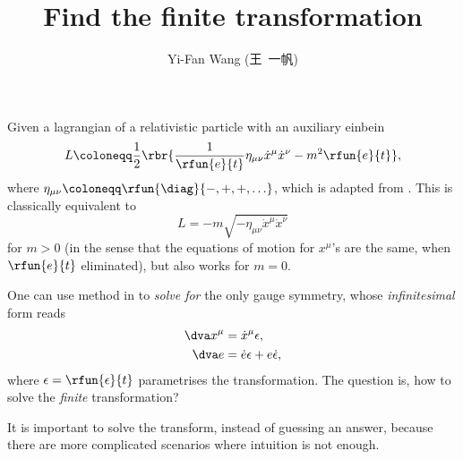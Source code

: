 \documentclass[a4paper,11pt]{article}
\title{Find the finite transformation}
\author{Yi-Fan Wang (王\ 一帆)}
\begin{document}
\maketitle

Given a lagrangian of a relativistic particle with an auxiliary einbein
\begin{equation}
L \coloneqq \frac{1}{2} \rbr{\frac{1}{\rfun{e}{t}}
\eta_{\mu\nu}\dot{x}^\mu \dot{x}^\nu - m^2 \rfun{e}{t}},
\label{eq:point-aux-lagrangian}
\end{equation}
where $\eta_{\mu\nu} \coloneqq \rfun{\diag}{-, +, +, \ldots}$, which is adapted 
from \cite[sec.\ 2.1]{Blumenhagen2013}. This is classically equivalent to
\begin{equation}
L = -m \sqrt{-\eta_{\mu\nu} \dot{x}^\mu \dot{x}^\nu }
\end{equation}
for $m>0$ (in the sense that the equations of motion for $x^\mu$'s are the 
same, when $\rfun{e}{t}$ eliminated), but also works for $m=0$.

One can use method in 
\cite[sec.\ 2]{Rothe2010} to \emph{solve for} the only gauge 
symmetry, whose \emph{infinitesimal} form reads
\begin{align}
\dva x^\mu &= \dot{x}^\mu \epsilon, \\
\dva e &= \dot{e} \epsilon + e \dot{\epsilon},
\end{align}
where $\epsilon = \rfun{\epsilon}{t}$ parametrises the transformation. The 
question is, how to solve the \emph{finite} transformation?

It is important to solve the transform, instead of guessing an answer, because 
there are more complicated scenarios where intuition is not enough.

\printbibliography
\end{document}
